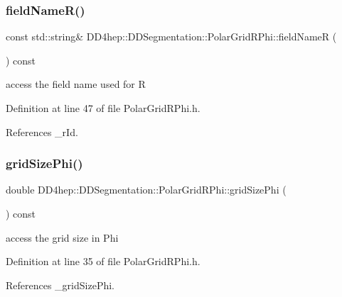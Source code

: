 \subsubsection{\texorpdfstring{field\+Name\+R()}{fieldNameR()}}
{\footnotesize\ttfamily const std\+::string\& D\+D4hep\+::\+D\+D\+Segmentation\+::\+Polar\+Grid\+R\+Phi\+::field\+NameR (\begin{DoxyParamCaption}{ }\end{DoxyParamCaption}) const\hspace{0.3cm}{\ttfamily [inline]}}



access the field name used for R 



Definition at line 47 of file Polar\+Grid\+R\+Phi.\+h.



References \+\_\+r\+Id.

\hypertarget{class_d_d4hep_1_1_d_d_segmentation_1_1_polar_grid_r_phi_a93f5cd60097fdcf0ec456db8a85c0991}{}\label{class_d_d4hep_1_1_d_d_segmentation_1_1_polar_grid_r_phi_a93f5cd60097fdcf0ec456db8a85c0991} 
\subsubsection{\texorpdfstring{grid\+Size\+Phi()}{gridSizePhi()}}
{\footnotesize\ttfamily double D\+D4hep\+::\+D\+D\+Segmentation\+::\+Polar\+Grid\+R\+Phi\+::grid\+Size\+Phi (\begin{DoxyParamCaption}{ }\end{DoxyParamCaption}) const\hspace{0.3cm}{\ttfamily [inline]}}



access the grid size in Phi 



Definition at line 35 of file Polar\+Grid\+R\+Phi.\+h.



References \+\_\+grid\+Size\+Phi.

\hypertarget{class_d_d4hep_1_1_d_d_segmentation_1_1_polar_grid_r_phi_a2fa9f81e23ed537e262664532523ca9d}{}\label{class_d_d4hep_1_1_d_d_segmentation_1_1_polar_grid_r_phi_a2fa9f81e23ed537e262664532523ca9d} 
